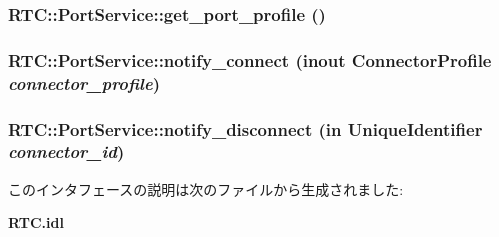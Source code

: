 \subsubsection[{get\_\-port\_\-profile}]{ RTC::PortService::get\_\-port\_\-profile ()}\label{interfaceRTC_1_1PortService_a90d7e716d7c9ca13bde3767b6d138e53}
\subsubsection[{notify\_\-connect}]{ RTC::PortService::notify\_\-connect (inout {\bf ConnectorProfile} {\em connector\_\-profile})}\label{interfaceRTC_1_1PortService_af021417d7d9c8966dd346d7193d5219b}
\subsubsection[{notify\_\-disconnect}]{ RTC::PortService::notify\_\-disconnect (in {\bf UniqueIdentifier} {\em connector\_\-id})}\label{interfaceRTC_1_1PortService_a13b9bb81cc0772ba243697a2d8e3e63d}


このインタフェースの説明は次のファイルから生成されました:\begin{DoxyCompactItemize}
\item 
{\bf RTC.idl}\end{DoxyCompactItemize}
